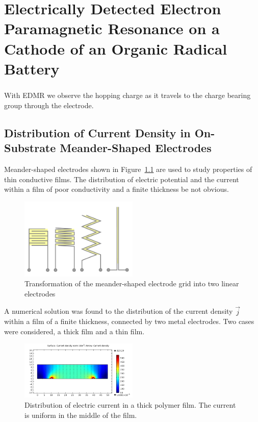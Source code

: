 \chapter{Electrically Detected Electron Paramagnetic Resonance on a Cathode of an Organic Radical Battery}

\paragraph*{}
With EDMR we observe the hopping charge as it travels to the charge bearing group through the electrode.

\section{Distribution of Current Density in On-Substrate Meander-Shaped Electrodes}
Meander-shaped electrodes shown in Figure~\ref{fig:grid} are used to study properties of thin conductive films. The distribution of electric potential and the current within a film of poor conductivity and a finite thickness be not obvious. 

\begin{figure} [!ht]
\begin{center}
       \includegraphics[width=0.5\textwidth]{./edmr/fingers1/pics/grid.pdf}
       \end{center}
\caption{Transformation of the meander-shaped electrode grid into two linear electrodes}
     \label{fig:grid}
\end{figure}

A numerical solution was found to the distribution of the current density $\vec{j}$ within a film of a finite thickness, connected by two metal electrodes. Two cases were considered, a thick film and a thin film.

\begin{figure} [!ht]
\begin{center}
       \includegraphics[width=0.5\textwidth]{./edmr/fingers1/pics/3_thick_film.png}
       \end{center}
\caption{Distribution of electric current in a thick polymer film. The current is uniform in the middle of the film. }
     \label{fig:dits_thick_2d}
\end{figure}

